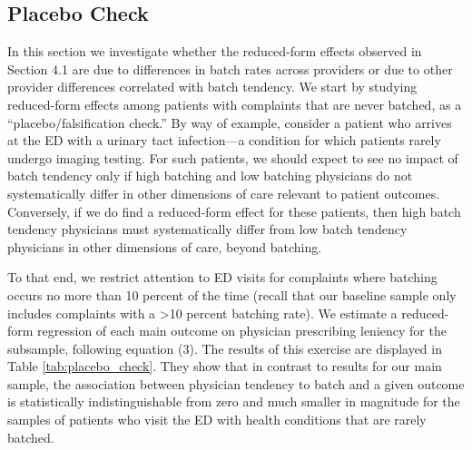 \documentclass[,,nonblindrev]{informs}
\begin{document}
\hypertarget{placebo-check}{%
\subsection{Placebo Check}\label{placebo-check}}

In this section we investigate whether the reduced-form effects observed
in Section 4.1 are due to differences in batch rates across providers or
due to other provider differences correlated with batch tendency. We
start by studying reduced-form effects among patients with complaints
that are never batched, as a ``placebo/falsification check.'' By way of
example, consider a patient who arrives at the ED with a urinary tact
infection---a condition for which patients rarely undergo imaging
testing. For such patients, we should expect to see no impact of batch
tendency only if high batching and low batching physicians do not
systematically differ in other dimensions of care relevant to patient
outcomes. Conversely, if we do find a reduced-form effect for these
patients, then high batch tendency physicians must systematically differ
from low batch tendency physicians in other dimensions of care, beyond
batching.

To that end, we restrict attention to ED visits for complaints where
batching occurs no more than 10 percent of the time (recall that our
baseline sample only includes complaints with a \textgreater10 percent
batching rate). We estimate a reduced-form regression of each main
outcome on physician prescribing leniency for the subsample, following
equation (3). The results of this exercise are displayed in Table
\ref{tab:placebo_check}. They show that in contrast to results for our
main sample, the association between physician tendency to batch and a
given outcome is statistically indistinguishable from zero and much
smaller in magnitude for the samples of patients who visit the ED with
health conditions that are rarely batched.
\end{document}
